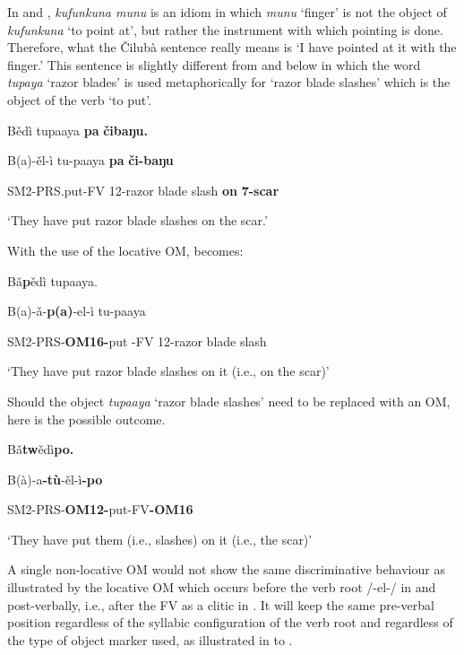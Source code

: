 \documentclass[output=paper]{langscibook}
\begin{document}
In  and , \textit{kufunkuna munu} is an idiom in which \textit{munu} ‘finger’ is not the object of \textit{kufunkuna}  ‘to point at’, but rather the instrument with which pointing is done. Therefore, what the Čilubà sentence really means is ‘I have pointed at it with the finger.’ This sentence is slightly different from  and  below in which the word \textit{tupaya} ‘razor blades’ is used metaphorically for ‘razor blade slashes’ which is the object of the verb ‘to put’.

\ea%
    \label{ex:lukusa:17}
    \z

          Bědì tupaaya  \textbf{pa} \textbf{čibaŋu.}                    

    B(a)-ěl-ì           tu-paaya          \textbf{pa} \textbf{či-baŋu}

    SM2-PRS.put-FV    12-razor blade slash    \textbf{on} \textbf{7-scar}  

\glt ‘They have put razor blade slashes on the scar.’

With the use of the locative OM,  becomes:

\ea%
    \label{ex:lukusa:18}
    \z

           B{ǎ}\textbf{p}ědì tupaaya.

    B(a)-{ǎ}{}-\textbf{p(}{\textbf{a)}}{}-el-ì        tu-paaya

     SM2-PRS-\textbf{OM16-}put  {}-FV  12-razor  blade  slash  

\glt ‘They have put razor blade slashes on it (i.e., on the scar)’

Should the object \textit{tupaaya} ‘razor blade slashes’ need to be replaced with an OM, here is the possible outcome.

\ea%
    \label{ex:lukusa:19}
    \z

          B{ǎ}\textbf{tw}ědì\textbf{po.}

    B({à})-a\textbf{{}-t}{\textbf{ù}}{}-ěl-ì\textbf{{}-po}

SM2-PRS-\textbf{OM12-}put-FV\textbf{{}-OM16} 

\glt ‘They have put them (i.e., slashes) on it (i.e., the scar)’

A single non-locative OM would not show the same discriminative behaviour as illustrated by the locative OM which occurs before the verb root /-el-/ in  and post-verbally, i.e., after the FV as a clitic in . It will keep the same pre-verbal position regardless of the syllabic configuration of the verb root and regardless of the type of object marker used, as illustrated in  to .
\end{document}
